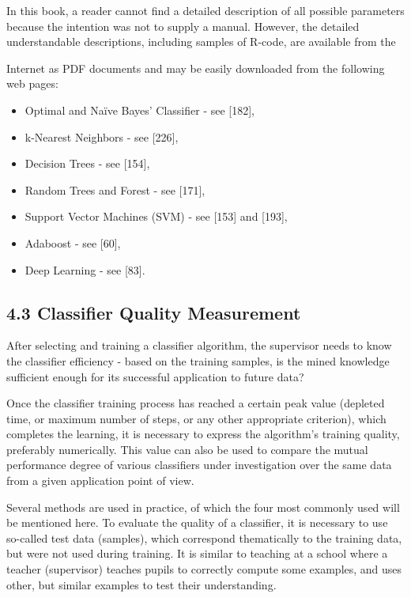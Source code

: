 \documentclass[10pt]{book}
\begin{document}
In this book, a reader cannot find a detailed description of all possible parameters because the intention was not to supply a manual. However, the detailed understandable descriptions, including samples of R-code, are available from the

Internet as PDF documents and may be easily downloaded from the following web pages:

\begin{itemize}
  \item Optimal and Naïve Bayes' Classifier - see [182],
  \item k-Nearest Neighbors - see [226],
  \item Decision Trees - see [154],
  \item Random Trees and Forest - see [171],
  \item Support Vector Machines (SVM) - see [153] and [193],
  \item Adaboost - see [60],
  \item Deep Learning - see [83].
\end{itemize}

\subsection*{4.3 Classifier Quality Measurement}
After selecting and training a classifier algorithm, the supervisor needs to know the classifier efficiency - based on the training samples, is the mined knowledge sufficient enough for its successful application to future data?

Once the classifier training process has reached a certain peak value (depleted time, or maximum number of steps, or any other appropriate criterion), which completes the learning, it is necessary to express the algorithm's training quality, preferably numerically. This value can also be used to compare the mutual performance degree of various classifiers under investigation over the same data from a given application point of view.

Several methods are used in practice, of which the four most commonly used will be mentioned here. To evaluate the quality of a classifier, it is necessary to use so-called test data (samples), which correspond thematically to the training data, but were not used during training. It is similar to teaching at a school where a teacher (supervisor) teaches pupils to correctly compute some examples, and uses other, but similar examples to test their understanding.
\end{document}
